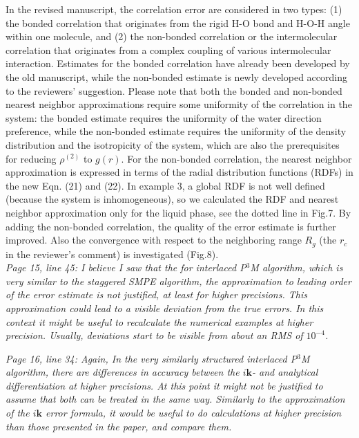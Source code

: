 \documentclass[a4paper]{article}
\begin{document}
In the revised manuscript, the correlation error are considered
in two types: 
(1) the bonded correlation
that originates from the rigid H-O
bond and H-O-H angle within one molecule,
and (2) the
non-bonded correlation or the
intermolecular correlation that originates from
a complex coupling of various intermolecular interaction.
Estimates for the bonded correlation
have already been developed by the old manuscript,
while the non-bonded estimate
is newly developed according to the reviewers' suggestion.
Please note that
both the bonded and non-bonded nearest neighbor approximations
require some uniformity of the correlation in the system:
the bonded estimate requires the uniformity of the water
direction preference, while the non-bonded estimate requires the uniformity
of the density distribution and the isotropicity of the system, which
are also the prerequisites for reducing $\rho^{(2)}$ to $g(r)$.
For the non-bonded correlation,  the nearest neighbor approximation 
is expressed in terms of the radial distribution
functions (RDFs) in the new Eqn. (21) and (22).
In example 3, a global RDF is not well defined
(because the system is inhomogeneous),
so we calculated the RDF and nearest neighbor approximation
only for the liquid phase, see the dotted line in Fig.7. By adding the
non-bonded correlation, the quality of the error estimate
is further improved.
Also the convergence with respect to
the neighboring range $R_g$ (the $r_c$ in the reviewer's comment)
is investigated (Fig.8). 
\\

\textit{ Page 15, line 45: I believe I saw that the for interlaced
  P$^3$M algorithm, which is very similar to the staggered SMPE
  algorithm, the approximation to leading order of the error estimate
  is not justified, at least for higher precisions. This approximation
  could lead to a visible deviation from the true errors. In this
  context it might be useful to recalculate the numerical examples at
  higher precision. Usually, deviations start to be visible from about
  an RMS of $10^{-4}$.  }

\textit{ Page 16, line 34: Again, In the very similarly structured
  interlaced P$^3$M algorithm, there are differences in accuracy
  between the $i\mathbf{k}$- and analytical differentiation at higher
  precisions. At this point it might not be justified to assume that
  both can be treated in the same way. Similarly to the approximation
  of the $i\mathbf{k}$ error formula, it would be useful to do
  calculations at higher precision than those presented in the paper,
  and compare them. }
\end{document}
